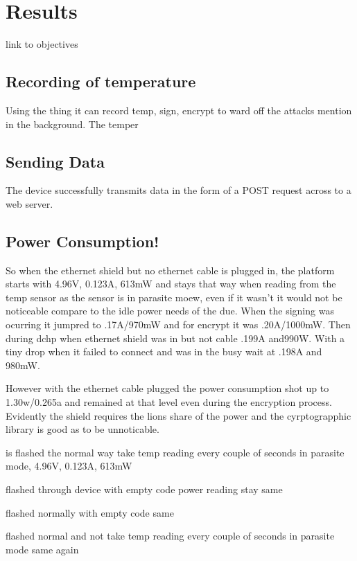 \chapter{Results}
\label{res}

link to objectives

\section{Recording of temperature}

Using the thing it can record temp, sign, encrypt to ward off the attacks mention in the background. The temper

\section{Sending Data}

The device successfully transmits data in the form of a POST request across to a web server.

\section{Power Consumption!}

So when the ethernet shield but no ethernet cable is plugged in, the platform starts with 4.96V, 0.123A, 613mW and stays that way when reading from the temp sensor as the sensor is in parasite moew, even if it wasn't it would not be noticeable compare to the idle power needs of the due. When the signing was ocurring it jumpred to .17A/970mW and for encrypt it was .20A/1000mW. Then during dchp when ethernet shield was in but not cable .199A and990W. With a tiny drop when it failed to connect and was in the busy wait at .198A and 980mW.

However with the ethernet cable plugged the power consumption shot up to 1.30w/0.265a and remained at that level even during the encryption process. Evidently the shield requires the lions share of the power and the cyrptograpphic library is good as to be unnoticable.


is flashed the normal way
take temp reading every couple of seconds in parasite mode, 
4.96V, 0.123A, 613mW

flashed through device with empty code
power reading stay same

flashed normally with empty code
same

flashed normal and not
take temp reading every couple of seconds in parasite mode
same again

